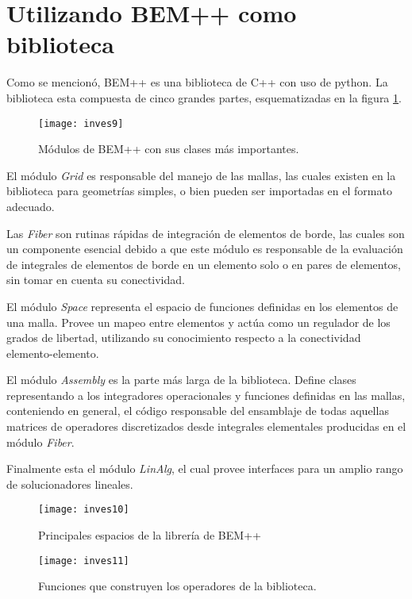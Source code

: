 \documentclass[12pt,letterpaper]{report}
\numberwithin{equation}{section}
\begin{document}
\section{Utilizando BEM++ como biblioteca}
Como se mencionó, BEM++ es una biblioteca de C++ con uso de python. La biblioteca esta compuesta de cinco grandes partes, esquematizadas en la figura \ref{bempp}. 

\begin{figure}[H]
	\centering
	\texttt{[image: inves9]}
	\caption{Módulos de BEM++ con sus clases más importantes.}
	\label{bempp}
\end{figure}

El módulo \textit{Grid} es responsable del manejo de las mallas, las cuales existen en la biblioteca para geometrías simples, o bien pueden ser importadas en el formato adecuado.

Las \textit{Fiber} son rutinas rápidas de integración de elementos de borde, las cuales son un componente esencial debido a que este módulo es responsable de la evaluación de integrales de elementos de borde en un elemento solo o en pares de elementos, sin tomar en cuenta su conectividad. 

El módulo \textit{Space} representa el espacio de funciones definidas en los elementos de una malla. Provee un mapeo entre elementos y actúa como un regulador de los grados de libertad, utilizando su conocimiento respecto a la conectividad elemento-elemento.

El módulo \textit{Assembly} es la parte más larga de la biblioteca. Define clases representando a los integradores operacionales y funciones definidas en las mallas, conteniendo en general, el código responsable del ensamblaje de todas aquellas matrices de operadores discretizados desde integrales elementales producidas en el módulo \textit{Fiber}.

Finalmente esta el módulo \textit{LinAlg}, el cual provee interfaces para un amplio rango de solucionadores lineales.


\begin{figure}[H]
	\centering
	\texttt{[image: inves10]}
	\caption{Principales espacios de la librería de BEM++}
\end{figure}

\begin{figure}[H]
	\centering
	\texttt{[image: inves11]}
	\caption{Funciones que construyen los operadores de la biblioteca.}
\end{figure}
\end{document}
